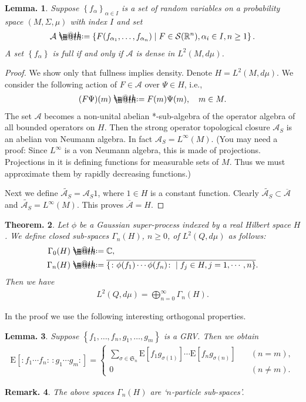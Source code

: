 \documentclass[openany, a4paper, oneside]{jsbook}
\makeatletter
\newcommand*{\defeq}{\mathrel{\rlap{%
\raisebox{0.3ex}{$\m@th\cdot$}}%
\raisebox{-0.3ex}{$\m@th\cdot$}}%
=}
\theoremstyle{break}
\theoremstyle{breakdefn}
\newtheorem{thm}{Theorem.}[section]
\newtheorem{lem}[thm]{Lemma.}
\newtheorem{rem}[thm]{Remark.}
\newcommand{\rbk}[1]{\left (#1\right)}
\newcommand{\sqbk}[1]{\left[#1\right]}
\newcommand{\cbk}[1]{\left\{#1\right\}}
\newcommand{\relmiddle}[1]{\mathrel{}\middle#1\mathrel{}}
\newcommand{\set}[2]{\left\{#1 \relmiddle| #2\right\}}
\newcommand{\bbC}{\mathbb{C}}
\newcommand{\bbR}{\mathbb{R}}
\newcommand{\calA}{\mathcal{A}}
\newcommand{\calS}{\mathcal{S}}
\newcommand{\E}[1]{\rmE\sqbk{#1}}
\newcommand{\rmE}{\mathrm{E}}
\makeatother
\begin{document}
\begin{lem}
 Suppose $\cbk{f_{\alpha}}_{\alpha \in I}$ is a set of random variables on a probability space $(M, \Sigma, \mu)$ with index $I$ and set
 \begin{align}
  \calA
  \defeq
  \set{F (f_{\alpha_1}, \dots, f_{\alpha_n})}{F \in \calS (\bbR^n), \alpha_i \in I, n \geq 1}.
 \end{align}
 A set $\cbk{f_{\alpha}}$ is full if and only if $\calA$ is dense in $L^2 (M, d \mu)$.
\end{lem}
\begin{proof}
 We show only that fullness implies density.
 Denote $H = L^2 (M, d \mu)$.
 We consider the following action of $F \in \calA$ over $\Psi \in H$, i.e.,
 \begin{align}
  (F \Psi) (m) \defeq F (m) \Psi (m), \quad m \in M.
 \end{align}
 The set $\calA$ becomes a non-unital abelian *-sub-algebra of the operator algebra of all bounded operators on $H$.
 Then the strong operator topological closure $\calA_S$ is an abelian von Neumann algebra.
 In fact $\calA_S = L^{\infty} (M)$.
 (You may need a proof:
 Since $L^{\infty}$ is a von Neumann algebra, this is made of projections.
 Projections in it is defining functions for measurable sets of $M$.
 Thus we must approximate them by rapidly decreasing functions.)

 Next we define $\tilde{\calA_S} = \calA_S 1$, where $1 \in H$ is a constant function.
 Clearly $\tilde{\calA_S} \subset \overline{\calA}$ and $\tilde{\calA_S} = L^{\infty}(M)$.
 This proves $\overline{\calA} = H$.
\end{proof}

\begin{thm}
 Let $\phi$ be a Gaussian super-process indexed by a real Hilbert space $H$.
 We define closed sub-spaces $\Gamma_n (H)$, $n \geq 0$, of $L^2 (Q, d \mu)$ as follows:
 \begin{align}
  \Gamma_0 (H)
  &\defeq \bbC, \\
  \Gamma_n (H)
  &\defeq
  \overline{\set{\colon \phi (f_1) \cdots \phi (f_n) \colon}{f_j \in H, j = 1, \cdots, n}}.
 \end{align}
 Then we have
 \begin{align}
  L^2 (Q, d \mu)
  =
  \bigoplus_{n=0}^{\infty} \Gamma_n (H).
 \end{align}
\end{thm}
In the proof we use the following interesting orthogonal properties.
\begin{lem}
 Suppose $\cbk{f_1, \dots, f_n, g_1, \dots, g_m}$ is a GRV.
 Then we obtain
 \begin{align}
  \E{\colon f_1 \cdots f_n \colon \, \colon g_1 \cdots g_m \colon}
  =
  \begin{cases}
   \sum_{\sigma \in \mathfrak{S}_n} \E{f_1 g_{\sigma \rbk{1}}} \cdots \E{f_n g_{\sigma \rbk{n}}} &\quad (n=m), \\
   0 &\quad (n \neq m).
  \end{cases}
 \end{align}
\end{lem}
\begin{rem}
 The above spaces $\Gamma_n (H)$ are `$n$-particle sub-spaces'.
\end{rem}
\end{document}
